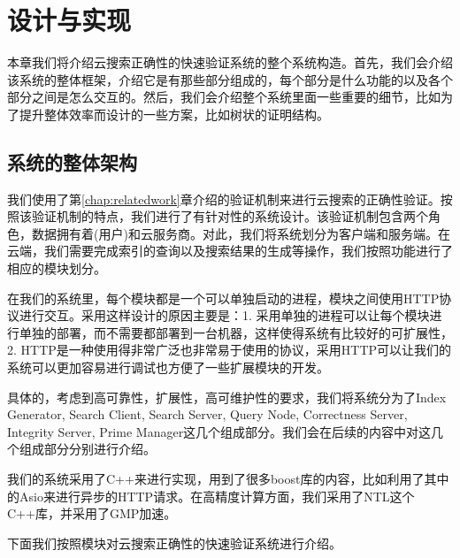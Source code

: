 \chapter{设计与实现}
\label{chap:design}


本章我们将介绍云搜索正确性的快速验证系统的整个系统构造。首先，我们会介绍该系统的整体框架，介绍它是有那些部分组成的，每个部分是什么功能的以及各个部分之间是怎么交互的。然后，我们会介绍整个系统里面一些重要的细节，比如为了提升整体效率而设计的一些方案，比如树状的证明结构。

\section{系统的整体架构}

我们使用了第\ref{chap:relatedwork}章介绍的验证机制来进行云搜索的正确性验证。按照该验证机制的特点，我们进行了有针对性的系统设计。该验证机制包含两个角色，数据拥有着(用户)和云服务商。对此，我们将系统划分为客户端和服务端。在云端，我们需要完成索引的查询以及搜索结果的生成等操作，我们按照功能进行了相应的模块划分。

在我们的系统里，每个模块都是一个可以单独启动的进程，模块之间使用HTTP协议进行交互。采用这样设计的原因主要是：1. 采用单独的进程可以让每个模块进行单独的部署，而不需要都部署到一台机器，这样使得系统有比较好的可扩展性，2. HTTP是一种使用得非常广泛也非常易于使用的协议，采用HTTP可以让我们的系统可以更加容易进行调试也方便了一些扩展模块的开发。

具体的，考虑到高可靠性，扩展性，高可维护性的要求，我们将系统分为了Index Generator, Search Client, Search Server, Query Node, Correctness Server, Integrity Server, Prime Manager这几个组成部分。我们会在后续的内容中对这几个组成部分分别进行介绍。

我们的系统采用了C++来进行实现，用到了很多boost库的内容，比如利用了其中的Asio来进行异步的HTTP请求。在高精度计算方面，我们采用了NTL这个C++库，并采用了GMP加速。

下面我们按照模块对云搜索正确性的快速验证系统进行介绍。


